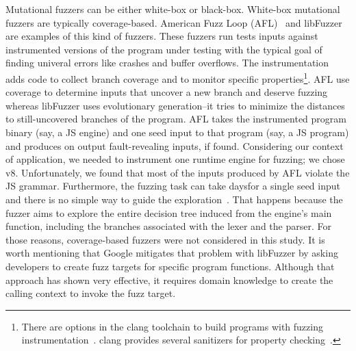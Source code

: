 \documentclass[10pt,conference,anonymous]{IEEEtran}
\begin{document}


Mutational fuzzers can be either white-box or black-box. White-box
mutational fuzzers are typically coverage-based. American Fuzz Loop
(AFL)~\cite{afl} and libFuzzer~\cite{libfuzzer} are examples of this
kind of fuzzers. These fuzzers run tests inputs against instrumented
versions of the program under testing with the typical goal of finding
univeral errors like crashes and buffer overflows. The instrumentation
adds code to collect branch coverage and to monitor specific
properties\footnote{There are options in the clang toolchain to build
  programs with fuzzing instrumentation~\cite{libfuzzer}. clang
  provides several sanitizers for property
  checking~\cite{clang-documentation}.}. AFL use coverage to determine
inputs that uncover a new branch and deserve fuzzing whereas libFuzzer
uses evolutionary generation--it tries to minimize the distances to
still-uncovered branches of the program. AFL takes the instrumented
program binary (say, a JS engine) and one seed input to that program
(say, a JS program) and produces on output fault-revealing inputs, if
found. Considering our context of application, we needed to instrument
one runtime engine for fuzzing; we chose v8. Unfortunately, we found
that most of the inputs produced by AFL violate the JS
grammar. Furthermore, the fuzzing task can take daysfor a single seed
input and there is no simple way to guide the
exploration~. That happens because the fuzzer aims to
explore the entire decision tree induced from the engine's main
function, including the branches associated with the lexer and the
parser. For those reasons, coverage-based fuzzers were not considered
in this study. It is worth mentioning that Google mitigates that
problem with libFuzzer by asking developers to create fuzz targets for
specific program
functions\cite{libFuzzer-tutorial-google,libFuzzer-chromium-google}. Although
that approach has shown very effective, it requires domain knowledge
to create the calling context to invoke the fuzz target.
\end{document}
